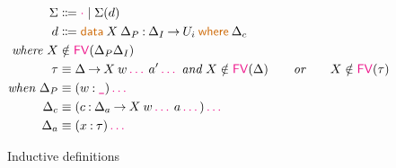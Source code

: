 \documentclass{article}
\newcommand{\meta}[1]{\mathsf{\textcolor{metacolour}{#1}}}
\newcommand{\ind}[1]{\mathsf{\textcolor{indcolour}{#1}}}
\newcommand{\constr}[1]{\mathsf{\textcolor{constrcolour}{#1}}}
\newcommand{\kw}[1]{\mathsf{\textcolor{kwcolour}{#1}}}
\newcommand{\kwopen}[1]{\kw{#1}\:}
\newcommand{\kwbin}[1]{\:\kw{#1}\:}
\newcommand{\poly}[2]{\forall #1 \mathpunct{.} #2}
\newcommand{\suc}[1]{\widehat{#1}}
\newcommand{\arr}[2]{#1 \mathbin{\rightarrow} #2}
\newcommand{\lam}[3]{\lambda #1 \mathbin{:} #2 \mathpunct{.} #3}
\newcommand{\app}[2]{#1 \: #2}
\newcommand{\App}[2]{#1 \: \mathopen{[} #2 \mathclose{]}}
\newcommand{\Type}[1]{\ind{Type}_{#1}}
\newcommand{\data}[3]{\kwopen{data} #1 \mathbin{:} #2 \kwbin{where} #3}
\newcommand{\annot}[2]{#1 \mathbin{:} #2}
\newcommand{\Eq}{\ind{Eq}}
\newcommand{\refl}{\constr{refl}}
\renewcommand{\equal}[4]{#1 \mathrel{\ind{=}}_{#2}^{#3} #1}
\newcommand{\Pair}[3]{\mathopen{\ind{(}} #1 \mathbin{:} #2 \mathbin{\ind{\times}} #3 \mathclose{\ind{)}}}
\newcommand{\pair}[2]{\mathopen{\constr{(}} #1 \mathpunct{\constr{,}} #2 \mathclose{\constr{)}}}
\newcommand{\Nat}{\ind{Nat}}
\newcommand{\nil}{\meta{\cdot}}
\newcommand{\seq}{\,\meta{\dots}\,}
\newcommand{\any}{\meta{\texttt{\_}}}
\newcommand{\FV}{\meta{FV}}
\begin{document}
\begin{figure}[h]
    \centering
    \begin{align*}
        \Sigma &\Coloneqq \nil \mid \Sigma(d) \\
        d &\Coloneqq \data{\app{X}{\Delta_P}}{\arr{\Delta_I}{U_{i}}}{\Delta_c} \\
        \textit{where} ~ X &\notin \FV(\Delta_P\Delta_I) \\
        \tau &\equiv \arr{\Delta}{\app{\app{X}{w \seq}}{a' \seq}} ~ \textit{and} ~ X \notin \FV(\Delta) \qquad \textit{or} \qquad X \notin \FV(\tau) \\
        \textit{when} ~ \Delta_P &\equiv (\annot{w}{\any}) \seq \\
        \Delta_c &\equiv (\annot{c}{\arr{\Delta_a}{\app{\app{X}{w \seq}}{a \seq}}}) \seq \\
        \Delta_a &\equiv (\annot{x}{\tau}) \seq
    \end{align*}
    \caption{Inductive definitions}
    \label{fig:inductive}
\end{figure}

\iffalse
\begin{figure}[h]
    \centering
    \begin{align*}
        &\data{\Nat}{\Type{}}{ \\
        &\quad \annot{\constr{zero}}{\poly{\alpha}{\App{\Nat}{\suc{\alpha}}}} \\
        &\quad \annot{\constr{succ}}{\poly{\alpha}{\arr{\App{\Nat}{\alpha}}{\App{\Nat}{\suc{\alpha}}}}}} \\
        \hfill \\
        &\data{\app{\Eq}{(\annot{A}{\Type{}})(\annot{a}{A})}}{\arr{A}{\Type{}}}{ \\
        &\quad \annot{\refl}{\poly{\alpha}{\app{\app{\app{\App{\Eq}{\suc{\alpha}}}{A}}{a}}{a}}}} \\
        &\textit{with} ~ \equal{a}{A}{s}{a} \equiv \app{\app{\app{\App{\Eq}{s}}{A}}{a}}{a} \\
        \hfill \\
        &\data{\app{\ind{Pair}}{(\annot{A}{\Type{}})(\annot{B}{\arr{A}{\Type{}}})}}{\Type{}}{ \\
        &\quad \annot{\constr{pair}}{\poly{\alpha}{\arr*{a}{A}{\arr{\app{B}{a}}{\app{\app{\App{\ind{Pair}}{\suc{\alpha}}}{A}}{B}}}}}} \\
        &\textit{with} ~ \Pair{x}{A}{B}^s \equiv \app{\app{\App{\ind{Pair}}{s}}{A}}{(\lam{x}{A}{B})} \\
        &\textit{and} ~ \pair{a}{b}^s_{\Pair{x}{A}{B}} \equiv \app{\app{\app{\app{\App{\constr{pair}}{s}}{A}}{(\lam{x}{A}{B})}}{a}}{b}
    \end{align*}
    \caption{Common inductive definitions}
    \label{fig:ind-defs}
\end{figure}
\fi
\end{document}
